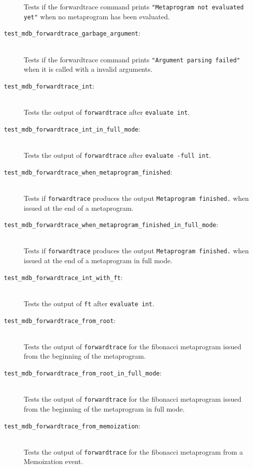 \begin{description}
        Tests if the forwardtrace command prints
        \texttt{"Metaprogram not evaluated yet"} when no metaprogram has been
        evaluated.
    \item[\texttt{test\_mdb\_forwardtrace\_garbage\_argument}:] \hfill \\
        Tests if the forwardtrace command prints
        \texttt{"Argument parsing failed"} when it is called with a invalid
        arguments.
    \item[\texttt{test\_mdb\_forwardtrace\_int}:] \hfill \\
        Tests the output of \texttt{forwardtrace} after \texttt{evaluate int}.
    \item[\texttt{test\_mdb\_forwardtrace\_int\_in\_full\_mode}:] \hfill \\
        Tests the output of \texttt{forwardtrace} after
        \texttt{evaluate -full int}.
    \item[\texttt{test\_mdb\_forwardtrace\_when\_metaprogram\_finished}:] \hfill \\
        Tests if \texttt{forwardtrace} produces the output
        \texttt{Metaprogram finished.} when issued at the end of a metaprogram.
    \item[\texttt{test\_mdb\_forwardtrace\_when\_metaprogram\_finished\_in\_full\_mode}:] \hfill \\
        Tests if \texttt{forwardtrace} produces the output
        \texttt{Metaprogram finished.} when issued at the end of a metaprogram
        in full mode.
    \item[\texttt{test\_mdb\_forwardtrace\_int\_with\_ft}:] \hfill \\
        Tests the output of \texttt{ft} after \texttt{evaluate int}.
    \item[\texttt{test\_mdb\_forwardtrace\_from\_root}:] \hfill \\
        Tests the output of \texttt{forwardtrace} for the fibonacci metaprogram
        issued from the beginning of the metaprogram.
    \item[\texttt{test\_mdb\_forwardtrace\_from\_root\_in\_full\_mode}:] \hfill \\
        Tests the output of \texttt{forwardtrace} for the fibonacci metaprogram
        issued from the beginning of the metaprogram in full mode.
    \item[\texttt{test\_mdb\_forwardtrace\_from\_memoization}:] \hfill \\
        Tests the output of \texttt{forwardtrace} for the fibonacci metaprogram
        from a Memoization event.

\end{description}
